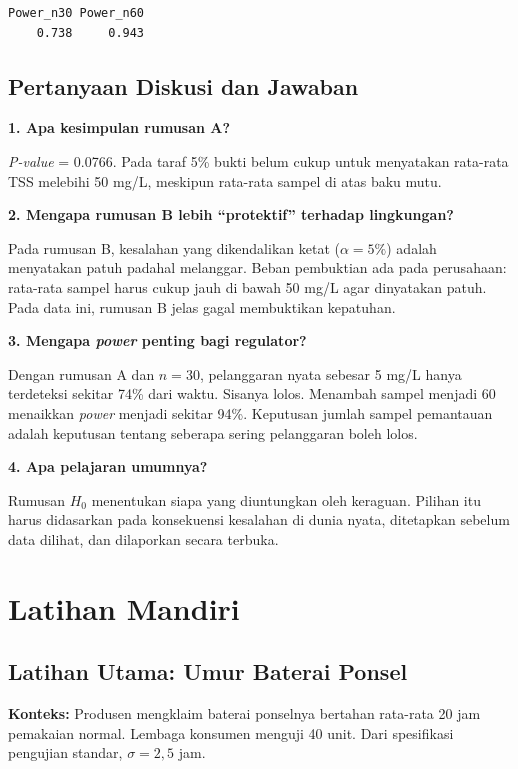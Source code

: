 \documentclass[
  indonesian,
  letterpaper,
]{book}
\begin{document}
\begin{verbatim}
Power_n30 Power_n60 
    0.738     0.943 
\end{verbatim}

\section{Pertanyaan Diskusi dan
Jawaban}\label{pertanyaan-diskusi-dan-jawaban-1}

\textbf{1. Apa kesimpulan rumusan A?}

\emph{P-value} = 0.0766. Pada taraf 5\% bukti belum cukup untuk
menyatakan rata-rata TSS melebihi 50 mg/L, meskipun rata-rata sampel di
atas baku mutu.

\textbf{2. Mengapa rumusan B lebih ``protektif'' terhadap lingkungan?}

Pada rumusan B, kesalahan yang dikendalikan ketat (\(\alpha = 5\%\))
adalah menyatakan patuh padahal melanggar. Beban pembuktian ada pada
perusahaan: rata-rata sampel harus cukup jauh di bawah 50 mg/L agar
dinyatakan patuh. Pada data ini, rumusan B jelas gagal membuktikan
kepatuhan.

\textbf{3. Mengapa \emph{power} penting bagi regulator?}

Dengan rumusan A dan \(n = 30\), pelanggaran nyata sebesar 5 mg/L hanya
terdeteksi sekitar 74\% dari waktu. Sisanya lolos. Menambah sampel
menjadi 60 menaikkan \emph{power} menjadi sekitar 94\%. Keputusan jumlah
sampel pemantauan adalah keputusan tentang seberapa sering pelanggaran
boleh lolos.

\textbf{4. Apa pelajaran umumnya?}

Rumusan \(H_0\) menentukan siapa yang diuntungkan oleh keraguan. Pilihan
itu harus didasarkan pada konsekuensi kesalahan di dunia nyata,
ditetapkan sebelum data dilihat, dan dilaporkan secara terbuka.


\chapter{Latihan Mandiri}\label{latihan-mandiri-1}

\section{Latihan Utama: Umur Baterai
Ponsel}\label{latihan-utama-umur-baterai-ponsel}

\textbf{Konteks:} Produsen mengklaim baterai ponselnya bertahan
rata-rata 20 jam pemakaian normal. Lembaga konsumen menguji 40 unit.
Dari spesifikasi pengujian standar, \(\sigma = 2{,}5\) jam.
\end{document}
